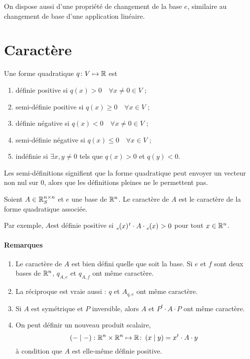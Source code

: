 On dispose aussi d'une propriété de changement de la base $e$, similaire au changement de base d'une application linéaire.

\section{Caractère}

\begin{defn}
Une forme quadratique $q \colon V \mapsto \mathbb{R}$ est
\begin{enumerate}
\item définie positive si $q(x)>0 \quad \forall x\neq 0\in V$ ;
\item semi-définie positive si $q(x)\ge 0\quad\forall x\in V$ ;
\item définie négative si $q(x)<0 \quad \forall x\neq 0\in V$ ;
\item semi-définie négative si $q(x)\le 0\quad\forall x\in V$ ;
\item indéfinie si $\exists x, y \neq 0$ tels que $q(x)>0$ et $q(y)<0$.
\end{enumerate}
Les semi-définitions signifient que la forme quadratique peut envoyer un vecteur non nul sur 0, alors que les définitions pleines ne le permettent pas.
\end{defn}
\begin{defn}
Soient $A \in \mathbb{R}^{n \times n}_S$ et $e$ une base de $\mathbb{R}^n$. Le caractère de $A$ est le caractère de la forme quadratique associée.

Par exemple, $A$est définie positive si $\elfbase{e}{x}{}^t \cdot A \cdot \elfbase{e}{x}{} > 0$ pour tout $x \in \mathbb{R}^n$.
\end{defn}

\paragraph{Remarques}

\begin{enumerate}
\item Le caractère de $A$ est bien défini quelle que soit la base. Si $e$ et $f$ sont deux bases de $\mathbb{R}^n$, $q_{A,e}$ et $q_{A,f}$ ont même caractère.
\item La réciproque est vraie aussi : $q$ et $A_{q,e}$ ont même caractère.
\item Si $A$ est symétrique et $P$ inversible, alors $A$ et $P^t \cdot A \cdot P$ ont même caractère.
\item On peut définir un nouveau produit scalaire,
\[ \left( - \mid - \right) \colon \mathbb{R}^n \times \mathbb{R}^n \mapsto \mathbb{R} \colon \left( x \mid y \right) = x^t \cdot A \cdot y \]
à condition que $A$ est elle-même définie positive.
\end{enumerate}

